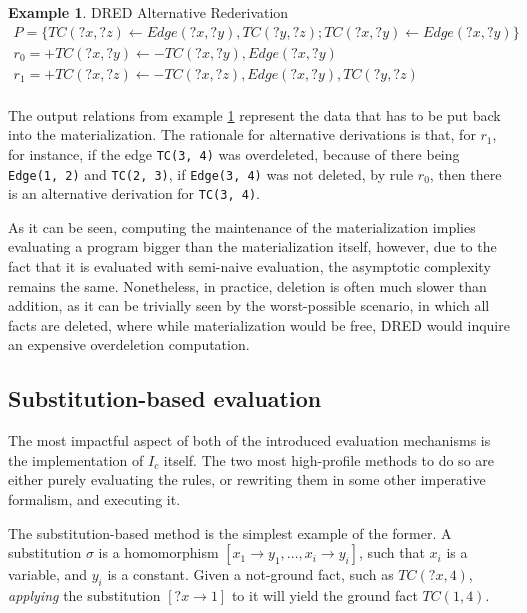 \documentclass[sigconf,screen,review,natbib]{acmart}
\theoremstyle{definition}
\newtheorem{exmp}{Example}[section]
\begin{document}
\begin{exmp}{DRED Alternative Rederivation}
	\tiny
	\begin{align}
		P = \{ TC(?x, ?z) \leftarrow Edge(?x, ?y), TC(?y, ?z); TC(?x, ?y) \leftarrow Edge(?x, ?y) \} \nonumber                                                           \\
		r_0 = +TC(?x, ?y) \leftarrow -TC(?x, ?y), Edge(?x, ?y)                                                                                                           \\
		r_1 = +TC(?x, ?z) \leftarrow -TC(?x, ?z), Edge(?x, ?y), TC(?y, ?z)                                                                                     \nonumber \\
	\end{align}
	\label{ex7}
\end{exmp}

The output relations from example \ref{ex7} represent the data that has to be put back into the materialization.
The rationale for alternative derivations is that, for $r_1$, for instance, if the edge \verb|TC(3, 4)| was
overdeleted, because of there being \verb|Edge(1, 2)| and \verb|TC(2, 3)|, if \verb|Edge(3, 4)| was not deleted, by
rule $r_0$, then there is an alternative derivation for \verb|TC(3, 4)|.

As it can be seen, computing the maintenance of the materialization implies evaluating a program bigger than the
materialization itself, however, due to the fact that it is evaluated with semi-naive evaluation, the asymptotic
complexity remains the same\cite{complexity_of_dred}. Nonetheless, in practice, deletion is often much slower than
addition, as it can be trivially seen by the worst-possible scenario, in which all facts are deleted, where while
materialization would be free, DRED would inquire an expensive overdeletion computation.

\subsection{Substitution-based evaluation}
The most impactful aspect of both of the introduced evaluation mechanisms is the implementation
of $I_c$ itself. The two most high-profile methods to do so are either purely evaluating the rules, or
rewriting them in some other imperative formalism, and executing it.

The substitution-based\cite{datalog} method is the simplest example of the former. A substitution $\sigma$ is
a homomorphism $[x_1 \rightarrow y_1, ..., x_i \rightarrow y_i]$, such that $x_i$ is a variable, and $y_i$ is
a constant. Given a not-ground fact, such as $TC(?x, 4)$, \textit{applying} the substitution $[?x \rightarrow 1]$ to
it will yield the ground fact $TC(1, 4)$.
\end{document}
